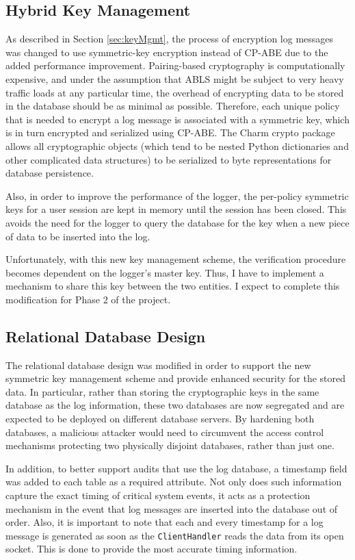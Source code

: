 \documentclass{sig-alternate}
\begin{document}
\subsection{Hybrid Key Management}
As described in Section \ref{sec:keyMgmt}, the process of encryption log messages was changed to use symmetric-key
encryption instead of CP-ABE due to the added performance improvement. Pairing-based cryptography is computationally
expensive, and under the assumption that ABLS might be subject to very heavy traffic loads at any particular time, the 
overhead of encrypting data to be stored in the database should be as minimal as possible. Therefore, each unique
policy that is needed to encrypt a log message is associated with a symmetric key, which is in turn encrypted and 
serialized using CP-ABE. The Charm crypto package allows all cryptographic objects (which tend to be nested
Python dictionaries and other complicated data structures) to be serialized to byte representations for database 
persistence. 

Also, in order to improve the performance of the logger, the per-policy symmetric keys for a user session are kept
in memory until the session has been closed. This avoids the need for the logger to query the database for the key 
when a new piece of data to be inserted into the log. 

Unfortunately, with this new key management scheme, the verification procedure becomes dependent on the
logger's master key. Thus, I have to implement a mechanism to share this key between the two entities. I expect
to complete this modification for Phase 2 of the project.

\subsection{Relational Database Design}
The relational database design was modified in order to support the new symmetric key management scheme and provide 
enhanced security for the stored data. In particular, rather than storing the cryptographic keys in the same database as the
log information, these two databases are now segregated and are expected to be deployed on different database servers.
By hardening both databases, a malicious attacker would need to circumvent the access control mechanisms protecting
two physically disjoint databases, rather than just one. 

In addition, to better support audits that use the log database, a timestamp field was added to each table as a required
attribute. Not only does such information capture the exact timing of critical system events, it acts as a protection
mechanism in the event that log messages are inserted into the database out of order. Also, it is important to note that
each and every timestamp for a log message is generated as soon as the {\tt ClientHandler} reads the data from
its open socket. This is done to provide the most accurate timing information.
\end{document}
